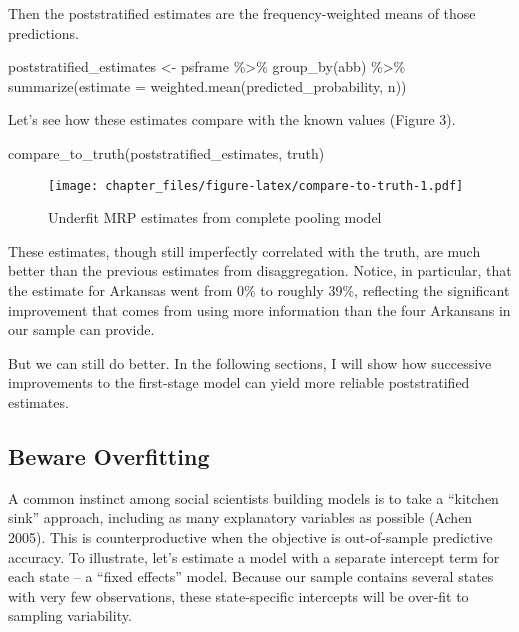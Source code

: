 \documentclass[
]{article}
\newenvironment{Shaded}{\begin{snugshade}}{\end{snugshade}}
\newcommand{\AttributeTok}[1]{\textcolor[rgb]{0.77,0.63,0.00}{#1}}
\newcommand{\FunctionTok}[1]{\textcolor[rgb]{0.00,0.00,0.00}{#1}}
\newcommand{\NormalTok}[1]{#1}
\newcommand{\OtherTok}[1]{\textcolor[rgb]{0.56,0.35,0.01}{#1}}
\newcommand{\SpecialCharTok}[1]{\textcolor[rgb]{0.00,0.00,0.00}{#1}}
\begin{document}
Then the poststratified estimates are the frequency-weighted means of
those predictions.

\begin{Shaded}
\begin{Highlighting}[]
\NormalTok{poststratified\_estimates }\OtherTok{\textless{}{-}}\NormalTok{ psframe }\SpecialCharTok{\%\textgreater{}\%} 
  \FunctionTok{group\_by}\NormalTok{(abb) }\SpecialCharTok{\%\textgreater{}\%} 
  \FunctionTok{summarize}\NormalTok{(}\AttributeTok{estimate =} \FunctionTok{weighted.mean}\NormalTok{(predicted\_probability, n))}
\end{Highlighting}
\end{Shaded}

Let's see how these estimates compare with the known values (Figure 3).

\begin{Shaded}
\begin{Highlighting}[]
\FunctionTok{compare\_to\_truth}\NormalTok{(poststratified\_estimates, truth)}
\end{Highlighting}
\end{Shaded}

\begin{figure}
\centering
\texttt{[image: chapter\_files/figure-latex/compare-to-truth-1.pdf]}
\caption{Underfit MRP estimates from complete pooling model}
\end{figure}

These estimates, though still imperfectly correlated with the truth, are
much better than the previous estimates from disaggregation. Notice, in
particular, that the estimate for Arkansas went from 0\% to roughly
39\%, reflecting the significant improvement that comes from using more
information than the four Arkansans in our sample can provide.

But we can still do better. In the following sections, I will show how
successive improvements to the first-stage model can yield more reliable
poststratified estimates.

\hypertarget{beware-overfitting}{%
\subsection{Beware Overfitting}\label{beware-overfitting}}

A common instinct among social scientists building models is to take a
``kitchen sink'' approach, including as many explanatory variables as
possible (Achen 2005). This is counterproductive when the objective is
out-of-sample predictive accuracy. To illustrate, let's estimate a model
with a separate intercept term for each state -- a ``fixed effects''
model. Because our sample contains several states with very few
observations, these state-specific intercepts will be over-fit to
sampling variability.
\end{document}
